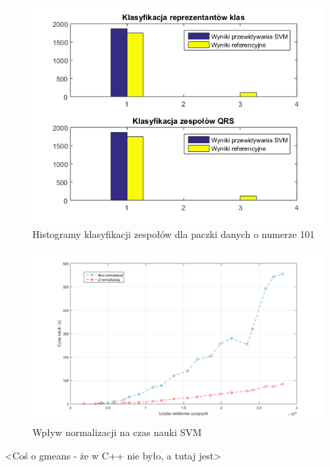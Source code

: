 \begin{figure}[!htp]
	\centering
	\includegraphics[width=15cm]{Grafika/101_2_3}
	\caption{Histogramy klasyfikacji zespołów dla paczki danych o numerze 101}
	\label{fig:hist1}
\end{figure}

\begin{figure}[!htp]
	\centering
	\includegraphics[width=16cm]{Grafika/SVMTrain}
	\caption{Wpływ normalizacji na czas nauki SVM}
	\label{fig:TrainNormSVM}
\end{figure}

<Coś o gmeans - że w C++ nie było, a tutaj jest>

